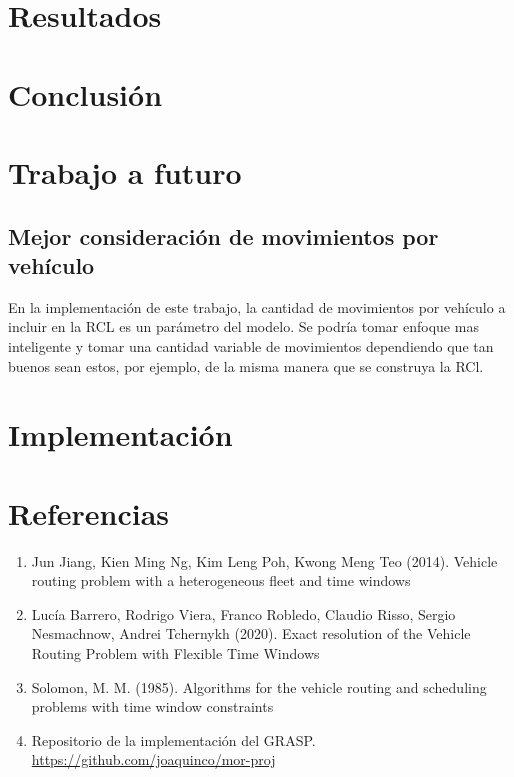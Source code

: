 \documentclass{article}
\begin{document}
  \section*{Resultados}

  \section*{Conclusión}

  \section*{Trabajo a futuro}

  \subsection*{Mejor consideración de movimientos por vehículo}
  
  En la implementación de este trabajo, la cantidad de movimientos por vehículo a incluir en la RCL es un parámetro del modelo. Se podría tomar enfoque mas inteligente y tomar una cantidad variable de movimientos dependiendo que tan buenos sean estos, por ejemplo, de la misma manera que se construya la RCl.

  \section*{Implementación}

  \section*{Referencias}

  \begin{enumerate}
    \item{\label{jiang} Jun Jiang, Kien Ming Ng, Kim Leng Poh, Kwong Meng Teo (2014). Vehicle routing problem with a heterogeneous fleet and time windows}
    \item{\label{inco} Lucía Barrero, Rodrigo Viera, Franco Robledo, Claudio Risso, Sergio Nesmachnow, Andrei Tchernykh (2020). Exact resolution of the Vehicle Routing Problem with Flexible Time Windows}
    \item{\label{solomon} Solomon, M. M. (1985). Algorithms for the vehicle routing and scheduling problems with time window constraints}
    \item{\label{repo} Repositorio de la implementación del GRASP. \url{https://github.com/joaquinco/mor-proj}}
  \end{enumerate}
\end{document}
